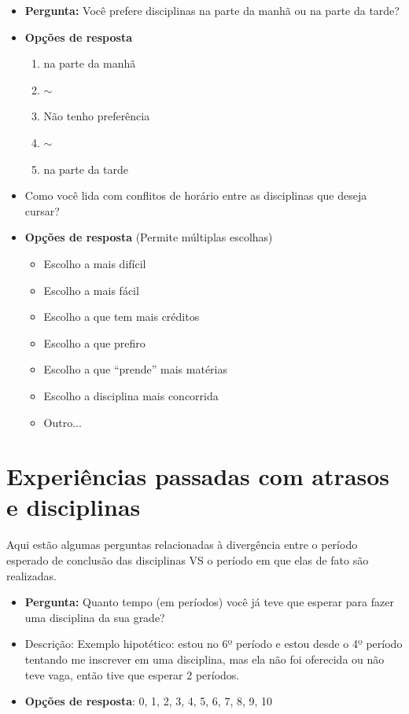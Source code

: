 \begin{apendicesenv}
  \begin{itemize}
    \item \textbf{Pergunta:} Você prefere disciplinas na parte da manhã ou na parte da tarde?
    \item \textbf{Opções de resposta}
          \begin{enumerate}
            \item na parte da manhã
            \item $\sim$
            \item Não tenho preferência
            \item $\sim$
            \item na parte da tarde
          \end{enumerate}
  \end{itemize}

  \begin{itemize}
    \item Como você lida com conflitos de horário entre as disciplinas que deseja cursar?
    \item \textbf{Opções de resposta} (Permite múltiplas escolhas)
          \begin{itemize}
            \item Escolho a mais difícil
            \item Escolho a mais fácil
            \item Escolho a que tem mais créditos
            \item Escolho a que prefiro
            \item Escolho a que ``prende'' mais matérias
            \item Escolho a disciplina mais concorrida
            \item Outro...
          \end{itemize}
  \end{itemize}

  \section*{Experiências passadas com atrasos e disciplinas}

  Aqui estão algumas perguntas relacionadas à divergência entre o período esperado de conclusão das disciplinas VS o período em que elas de fato são realizadas.

  \begin{itemize}
    \item \textbf{Pergunta:} Quanto tempo (em períodos) você já teve que esperar para fazer uma disciplina da sua grade?
    \item Descrição: Exemplo hipotético: estou no 6º período e estou desde o 4º período tentando me inscrever em uma disciplina, mas ela não foi oferecida ou não teve vaga, então tive que esperar 2 períodos.
    \item \textbf{Opções de resposta}: 0, 1, 2, 3, 4, 5, 6, 7, 8, 9, 10
  \end{itemize}


\end{apendicesenv}
